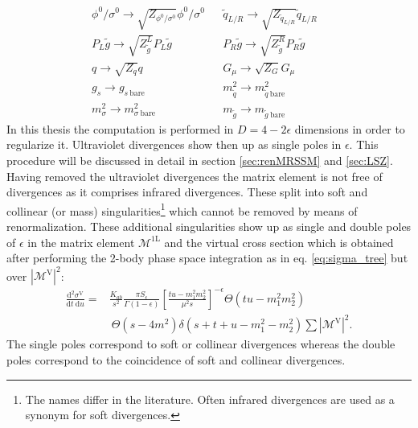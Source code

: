 \begin{align}
& \phi^0 / \sigma^0 \to \sqrt{Z_{\phi^0 / \sigma^0}}\phi^0 / \sigma^0 && \tilde{q}_{L/R} \to \sqrt{Z_{\tilde{q}_{L/R}}}\tilde{q}_{L/R}\nonumber\\
& P_L \tilde{g} \to \sqrt{Z_{\tilde{g}}^L} P_L \tilde{g} && P_R \tilde{g} \to \sqrt{Z_{\tilde{g}}^R} P_R \tilde{g}\nonumber\\
& q \to \sqrt{Z_q}q && G_\mu \to \sqrt{Z_G} G_\mu && \\
& g_s \to g_{s\ \mathrm{bare}} && m_{\tilde{q}}^2 \to m_{\tilde{q}\ \mathrm{bare}}^2\nonumber\\
&  m_{\sigma}^2 \to m_{\sigma\ \mathrm{bare}}^2 && m_{\tilde{g}} \to m_{\tilde{g}\ \mathrm{bare}}
\end{align}
In this thesis the computation is performed in $D = 4-2\epsilon$ dimensions in order to regularize it. Ultraviolet divergences show then up as single poles in $\epsilon$. This procedure will be discussed in detail in section \ref{sec:renMRSSM} and \ref{sec:LSZ}.\\
Having removed the ultraviolet divergences the matrix element is not free of divergences as it comprises infrared divergences. These split into soft and collinear (or mass) singularities\footnote{The names differ in the literature. Often infrared divergences are used as a synonym for soft divergences.} which cannot be removed by means of renormalization. These additional singularities show up as single and double poles of $\epsilon$ in the matrix element $\mathcal{M^{\mathrm{1L}}}$ and the virtual cross section which is obtained after performing the 2-body phase space  integration as in eq. \ref{eq:sigma_tree} but over $\left|\mathcal{M^{\mathrm{V}}}\right|^2$:
\begin{align}
\frac{\mbox{d}^2 \sigma^{\mathrm{V}}}{\mbox{d}t\ \mbox{d}u} =& \frac{K_{ab}}{s^2} \frac{\pi S_{\epsilon}}{\Gamma(1-\epsilon)} \left[ \frac{tu-m_1^2m_2^2}{\mu^2 s}\right]^{-\epsilon} \Theta(tu-m_1^2m_2^2)\nonumber\\
&\ \Theta(s-4m^2) \delta(s+t+u-m_1^2-m_2^2) \sum |\mathcal{M}^{\mathrm{V}}|^2.
\end{align}
The single poles correspond to soft or collinear divergences whereas the double poles correspond to the coincidence of soft and collinear divergences.



